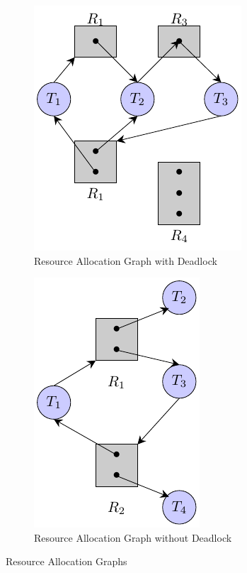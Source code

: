 \documentclass[oneside]{book}
\begin{document}
            \begin{figure}[H]
                \centering
                \begin{subfigure}{0.5\linewidth}
                        \centering
                        \includegraphics{figures/deadlock_resource_alloc_graph.pdf}
                        \caption{Resource Allocation Graph with Deadlock}
                \end{subfigure}%
                \begin{subfigure}{0.5\linewidth}
                        \centering
                        \includegraphics{figures/no_deadlock_resource_alloc_graph.pdf}
                        \caption{Resource Allocation Graph without Deadlock}
                \end{subfigure}
                \caption{Resource Allocation Graphs}
            \end{figure}
\end{document}
